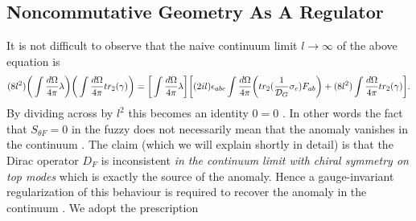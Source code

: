 \documentclass[a4paper,10pt]{article}
\begin{document}
\subsection{Noncommutative Geometry As A Regulator }
It is not difficult to observe that the naive continuum limit $l{\longrightarrow}{\infty}$ of the above equation is
\begin{eqnarray}
(8l^2)\bigg(\int \frac{d{\Omega}}{4{\pi}}{\lambda}\bigg)\bigg(\int \frac{d{\Omega}}{4{\pi}}tr_2({\gamma})\bigg)=\bigg[\int \frac{d{\Omega}}{4{\pi}}{\lambda}\bigg]\bigg[(2il){\epsilon}_{abc}\int \frac{d{\Omega}}{4{\pi}}\bigg(tr_2(\frac{1}{{\cal D}_{G}}{\sigma}_c)F_{ab}\bigg)+(8l^2)\int \frac{d{\Omega}}{4{\pi}}tr_2({\gamma})\bigg].\nonumber
\end{eqnarray}
By dividing across by $l^2$ this becomes an identity $0=0$ . In other words the fact that $S_{\theta F}=0$ in the fuzzy does not necessarily mean that the anomaly vanishes in the continuum . The claim (which we will explain shortly in detail) is that the Dirac operator $D_F$ is inconsistent {\it in the continuum limit with chiral symmetry on top modes } which is exactly the source of the anomaly.
Hence a gauge-invariant regularization of this  behaviour is required to recover the anomaly in the
continuum .  We adopt the prescription
\end{document}
